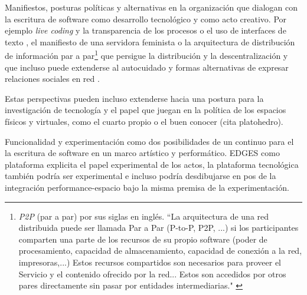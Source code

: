 Manifiestos, posturas políticas y alternativas en la organización que dialogan con la escritura de software como desarrollo tecnológico y como acto creativo. Por ejemplo \textit{live coding} y la transparencia de los procesos o el uso de interfaces de texto \citep{collinsLivecoding}, el manifiesto de una servidora feminista \citep{feministserver} o la arquitectura de distribución de información par a par\footnote{\textit{P2P} (par a par) por sus siglas en inglés.  ``La arquitectura de una red distribuida puede ser llamada Par a Par (P-to-P, P2P, ...)   si los participantes comparten una parte de los recursos de su propio software (poder de procesamiento, capacidad de almacenamiento, capacidad de conexión a la red, impresoras,...) Estos recursos compartidos son necesarios para proveer el Servicio y el contenido ofrecido por la red... Estos son accedidos por otros pares directamente sin pasar por entidades intermediarias." \citep{p2p}} que persigue la distribución y la descentralización y que incluso puede extenderse al autocuidado y formas alternativas de expresar relaciones sociales en red \citep{dwc}. 

Estas perspectivas pueden incluso extenderse hacia una postura para la investigación de tecnología y el papel que juegan en la política de los espacios físicos y virtuales, como el cuarto propio \citep{cuartopropio} o el buen conocer (cita platohedro).  

Funcionalidad y experimentación como dos posibilidades de un continuo para el la escritura de software en un marco artístico y performático. EDGES como plataforma explicita el papel experimental de los actos, la plataforma tecnológica también podría ser experimental e incluso podría desdibujarse en pos de la integración performance-espacio bajo la misma premisa de la experimentación. 


 
\iffalse

- manifiestos y posturas políticas > live coding y servidora feminista 
- Diferencias con respecto a otros espacios
- Discusión sobre lo digital, los nuevos medios y la virtualidad. 
- Giro de los nuevos medios
- Agotamiento del formato
- funcionalidad - experimentación 
- Arqueología en internet (cosas que ya tienen tiempo y cosas recientes). 
- El papel de los videojuegos gamización
- Lo barroco y el artículo de electroacústica. 
- Espacio, arquitectura e integración: puede el espacio virtual convertirse en un objeto con agencia en la interpretacion en vivo? 

\fi
